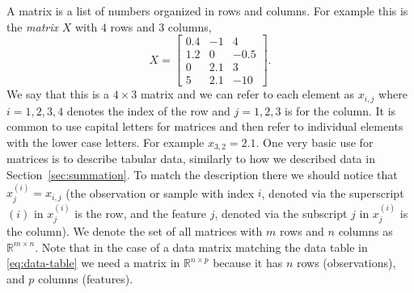 \documentclass[12pt]{article}
\begin{document}
A matrix is a list of numbers organized in rows and columns. For example this is the {\em matrix} $X$ with $4$ rows and $3$ columns,
%
\begin{equation}
\label{eq:matrix-example-1}
X
=
\begin{bmatrix}
    0.4 & -1 & 4\\
    1.2 & 0 & -0.5 \\
    0 &  2.1 & 3 \\
    5 & 2.1 & -10
 \end{bmatrix}.
\end{equation}
%
We say that this is a $4 \times 3$ matrix and we can refer to each element as $x_{i,j}$ where $i=1,2,3,4$ denotes the index of the row and $j=1,2,3$ is for the column. It is common to use capital letters for matrices and then refer to individual elements with the lower case letters. For example $x_{3,2} = 2.1$. One very basic use for matrices is to describe tabular data, similarly to how we described data in  Section~\ref{sec:summation}. To match the description there we should notice that $x^{(i)}_j = x_{i,j}$ (the observation or sample with index $i$, denoted via the superscript $(i)$ in $x^{(i)}_j$ is the row, and the feature $j$, denoted via the subscript $j$ in $x^{(i)}_j$ is the column). We denote the set of all matrices with $m$ rows and $n$ columns as ${\mathbb R}^{m \times n}$. Note that in the case of a data matrix matching the data table in \eqref{eq:data-table} we need a matrix in ${\mathbb R}^{n \times p}$ because it has $n$ rows (observations), and $p$ columns (features).
\end{document}
